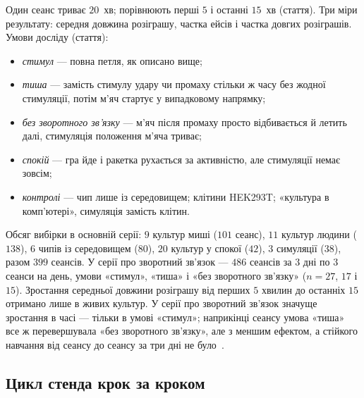 Один сеанс триває $20$~хв; порівнюють перші $5$ і останні $15$~хв (стаття). Три міри результату: середня довжина розіграшу, частка ейсів і частка довгих розіграшів. Умови досліду (стаття):
\begin{itemize}
\item \emph{стимул} --- повна петля, як описано вище;
\item \emph{тиша} --- замість стимулу удару чи промаху стільки ж часу без жодної стимуляції, потім м'яч стартує у випадковому напрямку;
\item \emph{без зворотного зв'язку} --- м'яч після промаху просто відбивається й летить далі, стимуляція положення м'яча триває;
\item \emph{спокій} --- гра йде і ракетка рухається за активністю, але стимуляції немає зовсім;
\item \emph{контролі} --- чип лише із середовищем; клітини HEK293T; «культура в комп'ютері», симуляція замість клітин.
\end{itemize}
Обсяг вибірки в основній серії: $9$ культур миші ($101$ сеанс), $11$ культур людини ($138$), $6$ чипів із середовищем ($80$), $20$ культур у спокої ($42$), $3$ симуляції ($38$), разом $399$ сеансів. У серії про зворотний зв'язок --- $486$ сеансів за $3$ дні по $3$ сеанси на день, умови «стимул», «тиша» і «без зворотного зв'язку» ($n=27$, $17$ і $15$). Зростання середньої довжини розіграшу від перших $5$ хвилин до останніх $15$ отримано лише в живих культур. У серії про зворотний зв'язок значуще зростання в часі --- тільки в умові «стимул»; наприкінці сеансу умова «тиша» все ж перевершувала «без зворотного зв'язку», але з меншим ефектом, а стійкого навчання від сеансу до сеансу за три дні не було~\cite{Kagan2022}.

\subsection*{Цикл стенда крок за кроком}

